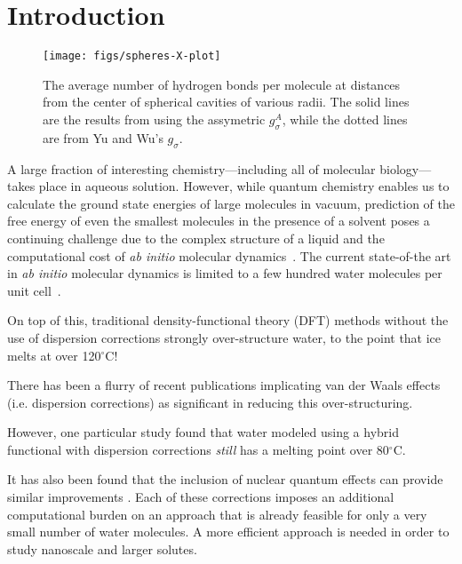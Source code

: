 \documentclass[twocolumn,amsmath,amssymb,prl]{revtex4-1}
\begin{document}
\section{Introduction}

\begin{figure}
\begin{center}
\texttt{[image: figs/spheres-X-plot]}
\end{center}
\caption{ The average number of hydrogen bonds per molecule at
  distances from the center of spherical cavities of various
  radii. The solid lines are the results from using the assymetric
  $g_{\sigma}^A$, while the dotted lines are from Yu and Wu's $g_{\sigma}$.}
\label{fig:spheres-X}
\end{figure}

A large fraction of interesting chemistry---including all of molecular
biology---takes place in aqueous solution.  However, while quantum
chemistry enables us to calculate the ground state energies of large
molecules in vacuum, prediction of the free energy of even the
smallest molecules in the presence of a solvent poses a continuing
challenge due to the complex structure of a liquid and the
computational cost of \emph{ab initio} molecular
dynamics~\cite{car1985, grossman2004}.  The current state-of-the art
in \emph{ab initio} molecular dynamics is limited to a few hundred
water molecules per unit cell~\cite{lewis2011doesnitric}.

On top of this, traditional density-functional theory (DFT) methods
without the use of dispersion corrections strongly over-structure
water, to the point that ice melts at over 120$^\circ$C\cite{yoo2009phase}!

There has been a flurry of recent
publications implicating van der Waals effects (i.e. dispersion
corrections) as significant in
reducing this over-structuring\cite{lin2009importance,
  wang2011density, mogelhoj2011ab, jonchiere2011van}.

However, one particular study found that water modeled using a
hybrid functional with dispersion corrections \emph{still} has a
melting point over 80$^\circ$C\cite{yoo2011}.

It has also
been found that the inclusion of nuclear quantum effects can provide
similar improvements \cite{morrone2008nuclear}.  Each of these
corrections imposes an additional computational burden on an approach
that is already feasible for only a very small number of water
molecules. A more efficient approach is needed in order to study
nanoscale and larger solutes.
\end{document}
